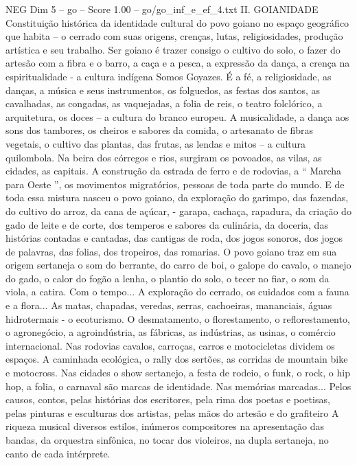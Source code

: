 \begin{textsample}{NEG Dim 5 – go – Score 1.00 – go/go\_inf\_e\_ef\_4.txt}  \label{ex:f5_neg_276}
II.
GOIANIDADE Constituição histórica da identidade cultural do povo goiano no espaço geográfico que habita – o cerrado com suas origens, crenças, lutas, religiosidades, produção artística e seu trabalho.
Ser goiano é trazer consigo o cultivo do solo, o fazer do artesão com a fibra e o barro, a caça e a pesca, a expressão da dança, a crença na espiritualidade - a cultura indígena Somos Goyazes.
É a fé, a religiosidade, as danças, a música e seus instrumentos, os folguedos, as festas dos santos, as cavalhadas, as congadas, as vaquejadas, a folia de reis, o teatro folclórico, a arquitetura, os doces – a cultura do branco europeu.
A musicalidade, a dança aos sons dos tambores, os cheiros e sabores da comida, o artesanato de fibras vegetais, o cultivo das plantas, das frutas, as lendas e mitos – a cultura quilombola.
Na beira dos córregos e rios, surgiram os povoados, as vilas, as cidades, as capitais.
A construção da estrada de ferro e de rodovias, a “ Marcha para Oeste ”, os movimentos migratórios, pessoas de toda parte do mundo.
E de toda essa mistura nasceu o povo goiano, da exploração do garimpo, das fazendas, do cultivo do arroz, da cana de açúcar, - garapa, cachaça, rapadura, da criação do gado de leite e de corte, dos temperos e sabores da culinária, da doceria, das histórias contadas e cantadas, das cantigas de roda, dos jogos sonoros, dos jogos de palavras, das folias, dos tropeiros, das romarias.
O povo goiano traz em sua origem sertaneja o som do berrante, do carro de boi, o galope do cavalo, o manejo do gado, o calor do fogão a lenha, o plantio do solo, o tecer no fiar, o som da viola, a catira.
Com o tempo...
A exploração do cerrado, os cuidados com a fauna e a flora...
As matas, chapadas, veredas, serras, cachoeiras, mananciais, águas hidrotermais - o ecoturismo.
O desmatamento, o florestamento, o reflorestamento, o agronegócio, a agroindústria, as fábricas, as indústrias, as usinas, o comércio internacional.
Nas rodovias cavalos, carroças, carros e motocicletas dividem os espaços.
A caminhada ecológica, o rally dos sertões, as corridas de mountain bike e motocross.
Nas cidades o show sertanejo, a festa de rodeio, o funk, o rock, o hip hop, a folia, o carnaval são marcas de identidade.
Nas memórias marcadas...
Pelos causos, contos, pelas histórias dos escritores, pela rima dos poetas e poetisas, pelas pinturas e esculturas dos artistas, pelas mãos do artesão e do grafiteiro A riqueza musical diversos estilos, inúmeros compositores na apresentação das bandas, da orquestra sinfônica, no tocar dos violeiros, na dupla sertaneja, no canto de cada intérprete.

\end{textsample}
